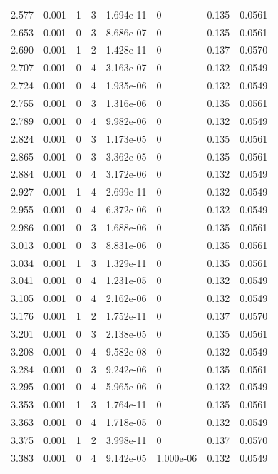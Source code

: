 \documentclass[preview]{standalone}
\begin{document}
{{{\begin{tabular}{L{1.2cm}C{1.2cm} C{0.3cm}C{0.5cm} C{1.4cm}C{1.4cm} C{1.4cm}C{1.4cm}}
  2.577  &  0.001  & 1     &  3 &  1.694e-11  & 0  & 0.135 &  0.0561   \\ 
  2.653  &  0.001  & 0     &  3 &  8.686e-07  & 0  & 0.135 &  0.0561   \\ 
  2.690  &  0.001  & 1     &  2 &  1.428e-11  & 0  & 0.137 &  0.0570   \\ 
  2.707  &  0.001  & 0     &  4 &  3.163e-07  & 0  & 0.132 &  0.0549   \\ 
  2.724  &  0.001  & 0     &  4 &  1.935e-06  & 0  & 0.132 &  0.0549   \\ 
  2.755  &  0.001  & 0     &  3 &  1.316e-06  & 0  & 0.135 &  0.0561   \\ 
  2.789  &  0.001  & 0     &  4 &  9.982e-06  & 0  & 0.132 &  0.0549   \\ 
  2.824  &  0.001  & 0     &  3 &  1.173e-05  & 0  & 0.135 &  0.0561   \\ 
  2.865  &  0.001  & 0     &  3 &  3.362e-05  & 0  & 0.135 &  0.0561   \\ 
  2.884  &  0.001  & 0     &  4 &  3.172e-06  & 0  & 0.132 &  0.0549   \\ 
  2.927  &  0.001  & 1     &  4 &  2.699e-11  & 0  & 0.132 &  0.0549   \\ 
  2.955  &  0.001  & 0     &  4 &  6.372e-06  & 0  & 0.132 &  0.0549   \\ 
  2.986  &  0.001  & 0     &  3 &  1.688e-06  & 0  & 0.135 &  0.0561   \\ 
  3.013  &  0.001  & 0     &  3 &  8.831e-06  & 0  & 0.135 &  0.0561   \\ 
  3.034  &  0.001  & 1     &  3 &  1.329e-11  & 0  & 0.135 &  0.0561   \\ 
  3.041  &  0.001  & 0     &  4 &  1.231e-05  & 0  & 0.132 &  0.0549   \\ 
  3.105  &  0.001  & 0     &  4 &  2.162e-06  & 0  & 0.132 &  0.0549   \\ 
  3.176  &  0.001  & 1     &  2 &  1.752e-11  & 0  & 0.137 &  0.0570   \\ 
  3.201  &  0.001  & 0     &  3 &  2.138e-05  & 0  & 0.135 &  0.0561   \\ 
  3.208  &  0.001  & 0     &  4 &  9.582e-08  & 0  & 0.132 &  0.0549   \\ 
  3.284  &  0.001  & 0     &  3 &  9.242e-06  & 0  & 0.135 &  0.0561   \\ 
  3.295  &  0.001  & 0     &  4 &  5.965e-06  & 0  & 0.132 &  0.0549   \\ 
  3.353  &  0.001  & 1     &  3 &  1.764e-11  & 0  & 0.135 &  0.0561   \\ 
  3.363  &  0.001  & 0     &  4 &  1.718e-05  & 0  & 0.132 &  0.0549   \\ 
  3.375  &  0.001  & 1     &  2 &  3.998e-11  & 0  & 0.137 &  0.0570   \\ 
  3.383  &  0.001  & 0     &  4 &  9.142e-05  & 1.000e-06  & 0.132 &  0.0549   \\ 
\hline 
\end{tabular} 

}}}
\end{document}
